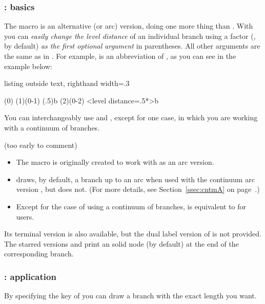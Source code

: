 \subsubsection{\protect\cmd{\istbA}: basics}

The macro \icmd{\istbA} is an alternative (or arc) version, doing one more thing than \cmd{\istb}. With \cmd{\istbA} you can \emph{easily change the level distance} of an individual branch using a factor (, by default) \emph{as the first optional argument} in parentheses. All other arguments are the same as in \cmd{\istb}.
For example,  is an abbreviation of ,
as you can see in the example below: 

\begin{tcblisting}{listing outside text, righthand width=.3\linewidth}
\begin{istgame}
\istroot(0)      \istb \istbA            \endist
\istroot(1)(0-1) \istb \istbA(.5){b}     \endist
\istroot(2)(0-2) \istb
 \istbA<level distance=.5*\xtlevdist>{b} \endist
\end{istgame}
\end{tcblisting}

You can interchangeably use \icmd{\istbA} and \cmd{\istb}, except for one case, in which you are working with  a continuum of branches.

\remark (too early to comment)
\begin{itemize}\tightlist
\item The macro \cmd{\istbA} is originally created to work with \cmd{\istrootcntmA} as an arc version.
\item \cmd{\istbA} draws, by default, a branch up to an arc when used with the continuum arc version \cmd{\istrootcntmA}, but \cmd{\istb} does not. (For more details, see Section~\ref{ssec:cntmA} on page~\pageref{ssec:cntmA}.)
\item Except for the case of using a continuum of branches, \cmd{\istbA} is equivalent to \cmd{\istb} for users.
\end{itemize}

Its terminal version \icmd{\istbAt} is also available, but the dual label version of \cmd{\istbA} is not provided.
The starred versions \icmd{\istbA*} and \icmd{\istbAt*} print an solid node (by default) at the end of the corresponding branch.

\subsubsection{\protect\cmd{\istbA}: application}
By specifying the  key of \cmd{\istb} you can draw a branch with the exact length you want.

